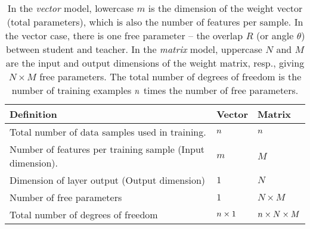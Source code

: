 \begin{table}[H]
\centering
\begin{tabular}{l|l|l}
\toprule
 \textbf{Definition} & \textbf{Vector} & \textbf{Matrix} \\
\midrule
 Total number of data samples used in training. & $n$ & $n$ \\
 Number of features per training sample (Input dimension). & $m$ & $M$ \\
 Dimension of layer output (Output dimension)  & $1$ & $N$ \\
 Number of free parameters & $1$ & $N\times M$ \\
 Total number of degrees of freedom & $n\times 1$ & $n\times N\times M$ \\
\bottomrule
\end{tabular}
\caption{In the \emph{vector} model, lowercase $m$ is the dimension of the weight vector (total parameters), which is also the number of features per sample. In the vector case, there is one free parameter -- the overlap $R$ (or angle $\theta$) between student and teacher. In the \emph{matrix} model, uppercase $N$ and $M$ are the input and output dimensions of the weight matrix, resp., giving $N\times M$ free parameters.
The total number of degrees of freedom is the number of training examples $n$ times the number of free parameters.}
\label{tab:dim_notation}
\end{table}

